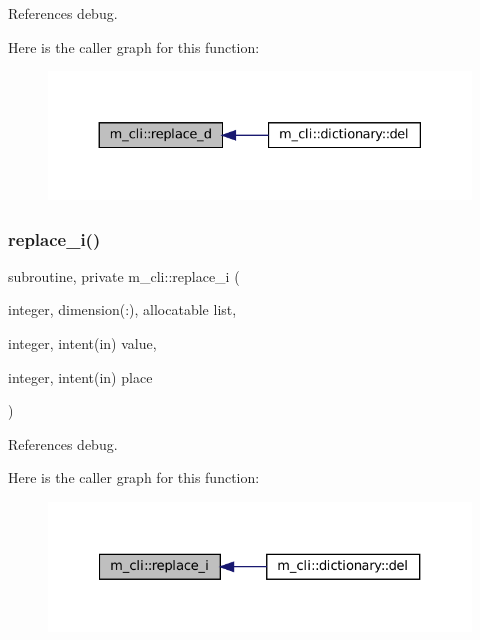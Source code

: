 References debug.

Here is the caller graph for this function\+:\nopagebreak
\begin{figure}[H]
\begin{center}
\leavevmode
\includegraphics[width=330pt]{namespacem__cli_aa9b7d672cc9fb0bc79fd09a2870614f5_icgraph}
\end{center}
\end{figure}
\mbox{\label{namespacem__cli_ac609c48bb1f904235b8cbf8bea61473f}} 
\subsubsection{\texorpdfstring{replace\+\_\+i()}{replace\_i()}}
{\footnotesize\ttfamily subroutine, private m\+\_\+cli\+::replace\+\_\+i (\begin{DoxyParamCaption}\item[{integer, dimension(\+:), allocatable}]{list,  }\item[{integer, intent(in)}]{value,  }\item[{integer, intent(in)}]{place }\end{DoxyParamCaption})\hspace{0.3cm}{\ttfamily [private]}}



References debug.

Here is the caller graph for this function\+:\nopagebreak
\begin{figure}[H]
\begin{center}
\leavevmode
\includegraphics[width=327pt]{namespacem__cli_ac609c48bb1f904235b8cbf8bea61473f_icgraph}
\end{center}
\end{figure}
\mbox{\label{namespacem__cli_a89ed5c3b944f91d8135173206fbc7e07}} 

